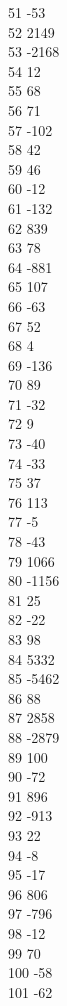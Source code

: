 { 51	-53 \\
 52	2149 \\
 53	-2168 \\
 54	12 \\
 55	68 \\
 56	71 \\
 57	-102 \\
 58	42 \\
 59	46 \\
 60	-12 \\
 61	-132 \\
 62	839 \\
 63	78 \\
 64	-881 \\
 65	107 \\
 66	-63 \\
 67	52 \\
 68	4 \\
 69	-136 \\
 70	89 \\
 71	-32 \\
 72	9 \\
 73	-40 \\
 74	-33 \\
 75	37 \\
 76	113 \\
 77	-5 \\
 78	-43 \\
 79	1066 \\
 80	-1156 \\
 81	25 \\
 82	-22 \\
 83	98 \\
 84	5332 \\
 85	-5462 \\
 86	88 \\
 87	2858 \\
 88	-2879 \\
 89	100 \\
 90	-72 \\
 91	896 \\
 92	-913 \\
 93	22 \\
 94	-8 \\
 95	-17 \\
 96	806 \\
 97	-796 \\
 98	-12 \\
 99	70 \\
 100	-58 \\
 101	-62 \\
}
